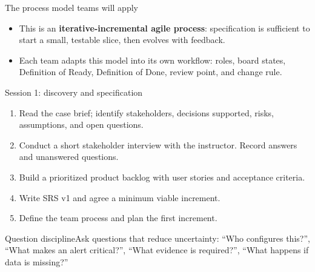 \begin{frame}{The process model teams will apply}
\centering
{}
\vspace{0.55em}
\begin{itemize}
\item This is an \textbf{iterative-incremental agile process}: specification is sufficient to start a small, testable slice, then evolves with feedback.
\item Each team adapts this model into its own workflow: roles, board states, Definition of Ready, Definition of Done, review point, and change rule.
\end{itemize}
\coursefooter
\end{frame}

\begin{frame}{Session 1: discovery and specification}
\begin{enumerate}
\item Read the case brief; identify stakeholders, decisions supported, risks, assumptions, and open questions.
\item Conduct a short stakeholder interview with the instructor. Record answers and unanswered questions.
\item Build a prioritized product backlog with user stories and acceptance criteria.
\item Write SRS v1 and agree a minimum viable increment.
\item Define the team process and plan the first increment.
\end{enumerate}
\begin{block}{Question discipline}Ask questions that reduce uncertainty: ``Who configures this?'', ``What makes an alert critical?'', ``What evidence is required?'', ``What happens if data is missing?''\end{block}
\coursefooter
\end{frame}

